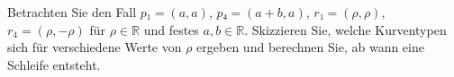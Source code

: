 %
Betrachten Sie den Fall $p₁ = (a, a)$, $p₄ = (a + b, a)$, $r₁ = (ρ, ρ)$, 
$r_4 = (ρ, -ρ)$ für $ρ ∈ ℝ$ und festes $a, b \in ℝ$. Skizzieren Sie, 
welche Kurventypen sich für verschiedene Werte von $ρ$ ergeben und 
berechnen Sie, ab wann eine Schleife entsteht. 
